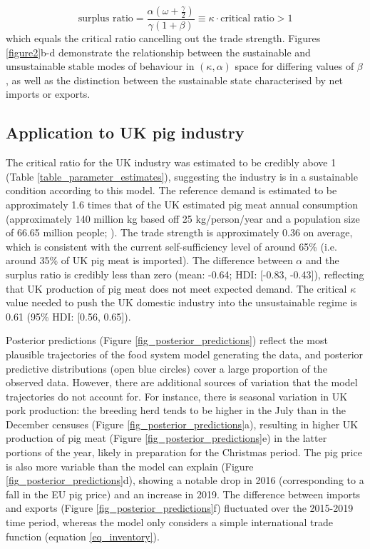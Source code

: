 \documentclass[12pt]{article}
\begin{document}
\begin{equation}
  \text{surplus ratio} = \frac{\alpha (\omega + \frac{\gamma}{2})}{\gamma (1 + \beta)} \equiv \kappa \cdot \text{critical ratio} > 1
\end{equation}
%
which equals the critical ratio cancelling out the trade strength. Figures \ref{figure2}b-d demonstrate the relationship between the sustainable and unsustainable stable modes of behaviour in $(\kappa, \alpha)$ space for differing values of $\beta$, as well as the distinction between the sustainable state characterised by net imports or exports.

\subsection{Application to UK pig industry}
The critical ratio for the UK industry was estimated to be credibly above 1 (Table \ref{table_parameter_estimates}), suggesting the industry is in a sustainable condition according to this model. The reference demand is estimated to be approximately 1.6 times that of the UK estimated pig meat annual consumption (approximately 140 million kg based off 25 kg/person/year and a population size of 66.65 million people; \cite{AHDBpocketbook2018}). The trade strength is approximately 0.36 on average, which is consistent with the current self-sufficiency level of around 65\% (i.e. around 35\% of UK pig meat is imported). The difference between $\alpha$ and the $\text{surplus ratio}$ is credibly less than zero (mean: -0.64; HDI: [-0.83, -0.43]), reflecting that UK production of pig meat does not meet expected demand. The critical $\kappa$ value needed to push the UK domestic industry into the unsustainable regime is 0.61 (95\% HDI: [0.56, 0.65]).

Posterior predictions (Figure \ref{fig_posterior_predictions}) reflect the most plausible trajectories of the food system model generating the data, and posterior predictive distributions (open blue circles) cover a large proportion of the observed data. However, there are additional sources of variation that the model trajectories do not account for. For instance, there is seasonal variation in UK pork production: the breeding herd tends to be higher in the July than in the December censuses (Figure \ref{fig_posterior_predictions}a), resulting in higher UK production of pig meat (Figure \ref{fig_posterior_predictions}e) in the latter portions of the year, likely in preparation for the Christmas period. The pig price is also more variable than the model can explain (Figure \ref{fig_posterior_predictions}d), showing a notable drop in 2016 (corresponding to a fall in the EU pig price) and an increase in 2019. The difference between imports and exports (Figure \ref{fig_posterior_predictions}f) fluctuated over the 2015-2019 time period, whereas the model only considers a simple international trade function (equation \ref{eq_inventory}).
\end{document}
